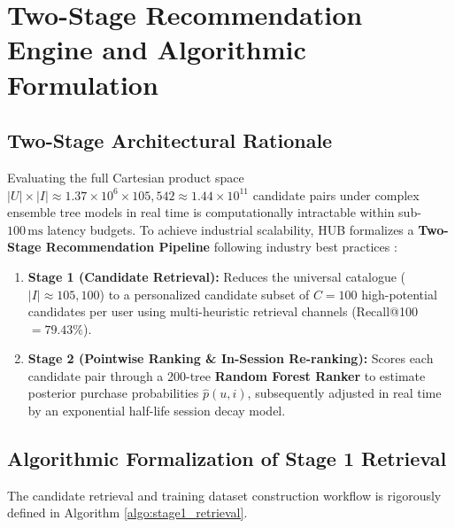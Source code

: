 \section{Two-Stage Recommendation Engine and Algorithmic Formulation}

\subsection{Two-Stage Architectural Rationale}
Evaluating the full Cartesian product space $|U| \times |I| \approx 1.37 \times 10^6 \times 105,542 \approx 1.44 \times 10^{11}$ candidate pairs under complex ensemble tree models in real time is computationally intractable within sub-$100\,\text{ms}$ latency budgets. To achieve industrial scalability, HUB formalizes a \textbf{Two-Stage Recommendation Pipeline} following industry best practices \cite{covington2016deep}:
\begin{enumerate}
    \item \textbf{Stage 1 (Candidate Retrieval):} Reduces the universal catalogue ($|I| \approx 105,100$) to a personalized candidate subset of $C=100$ high-potential candidates per user using multi-heuristic retrieval channels (Recall@100 $= 79.43\%$).
    \item \textbf{Stage 2 (Pointwise Ranking \& In-Session Re-ranking):} Scores each candidate pair through a 200-tree \textbf{Random Forest Ranker} to estimate posterior purchase probabilities $\hat{p}(u, i)$, subsequently adjusted in real time by an exponential half-life session decay model.
\end{enumerate}

\subsection{Algorithmic Formalization of Stage 1 Retrieval}
The candidate retrieval and training dataset construction workflow is rigorously defined in Algorithm \ref{algo:stage1_retrieval}.


